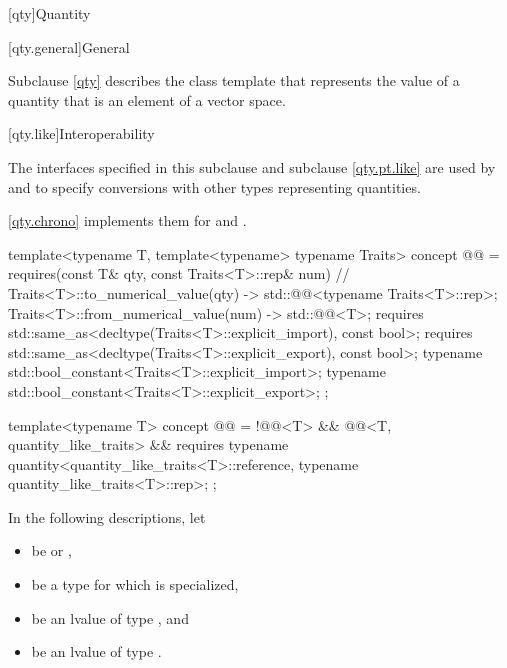 [qty]{Quantity}

[qty.general]{General}

\pnum
Subclause \ref{qty} describes the class template 
that represents the value of a quantity
that is an element of a vector space.

[qty.like]{Interoperability}

\pnum
The interfaces specified in this subclause and subclause \ref{qty.pt.like}
are used by  and 
to specify conversions with other types representing quantities.
\begin{note}
\ref{qty.chrono} implements them for  and .
\end{note}

\begin{itemdecl}
template<typename T, template<typename> typename Traits>
concept @@ = requires(const T& qty, const Traits<T>::rep& num) {  // \expos
  { Traits<T>::to_numerical_value(qty) } -> std::@@<typename Traits<T>::rep>;
  { Traits<T>::from_numerical_value(num) } -> std::@@<T>;
  requires std::same_as<decltype(Traits<T>::explicit_import), const bool>;
  requires std::same_as<decltype(Traits<T>::explicit_export), const bool>;
  typename std::bool_constant<Traits<T>::explicit_import>;
  typename std::bool_constant<Traits<T>::explicit_export>;
};

template<typename T>
concept @@ = !@@<T> && @@<T, quantity_like_traits> && requires {
  typename quantity<quantity_like_traits<T>::reference, typename quantity_like_traits<T>::rep>;
};
\end{itemdecl}

\pnum
In the following descriptions, let
\begin{itemize}
\item
{} be  or ,
\item
{} be a type for which  is specialized,
\item
{} be an lvalue of type , and
\item
{} be an lvalue of type .
\end{itemize}

